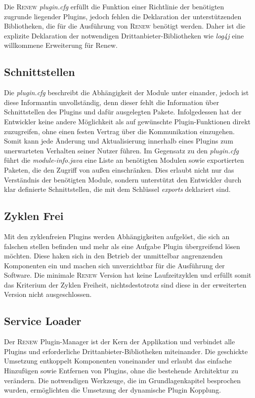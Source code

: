 		Die \textsc{Renew} \textit{plugin.cfg} erfüllt die Funktion einer Richtlinie der benötigten zugrunde liegender Plugins, jedoch fehlen die Deklaration der unterstützenden Bibliotheken, die für die Ausführung von \textsc{Renew} benötigt werden. Daher ist die explizite Deklaration der notwendigen Drittanbieter-Bibliotheken wie \textit{log4j} eine willkommene Erweiterung für Renew. 


	\subsection{Schnittstellen} %
		Die \textit{plugin.cfg} beschreibt die Abhängigkeit der Module unter einander, jedoch ist diese Informantin unvollständig, denn dieser fehlt die Information über Schnittstellen des Plugins und dafür ausgelegten Pakete. Infolgedessen hat der Entwickler keine andere Möglichkeit als auf gewünschte Plugin-Funktionen direkt zuzugreifen, ohne einen festen Vertrag über die Kommunikation einzugehen. Somit kann jede Änderung und Aktualisierung innerhalb eines Plugins zum unerwarteten Verhalten seiner Nutzer führen. \newline
		Im Gegensatz zu den \textit{plugin.cfg} führt die \textit{module-info.java} eine Liste an benötigten Modulen sowie exportierten Paketen, die den Zugriff von außen einschränken. Dies erlaubt nicht nur das Verständnis der benötigten Module, sondern unterstützt den Entwickler durch klar definierte Schnittstellen, die mit dem Schlüssel \textit{exports} deklariert sind.

	\subsection{Zyklen Frei} %
		Mit den zyklenfreien Plugins werden Abhängigkeiten aufgelöst, die sich an falschen stellen befinden und mehr als eine Aufgabe Plugin übergreifend lösen möchten. Diese haken sich in den Betrieb der unmittelbar angrenzenden Komponenten ein und machen sich unverzichtbar für die Ausführung der Software. Die minimale \textsc{Renew} Version hat keine Laufzeitzyklen und erfüllt somit das Kriterium der Zyklen Freiheit, nichtsdestotrotz sind diese in der erweiterten Version nicht ausgeschlossen.

	\subsection{Service Loader} 
		Der \textsc{Renew} Plugin-Manager ist der Kern der Applikation und verbindet alle Plugins und erforderliche Drittanbieter-Bibliotheken miteinander. Die geschickte Umsetzung entkoppelt Komponenten voneinander und erlaubt das einfache Hinzufügen sowie Entfernen von Plugins, ohne die bestehende Architektur zu verändern. Die notwendigen Werkzeuge, die im Grundlagenkapitel besprochen wurden, ermöglichten die Umsetzung der dynamische Plugin Kopplung. \bigbreak

